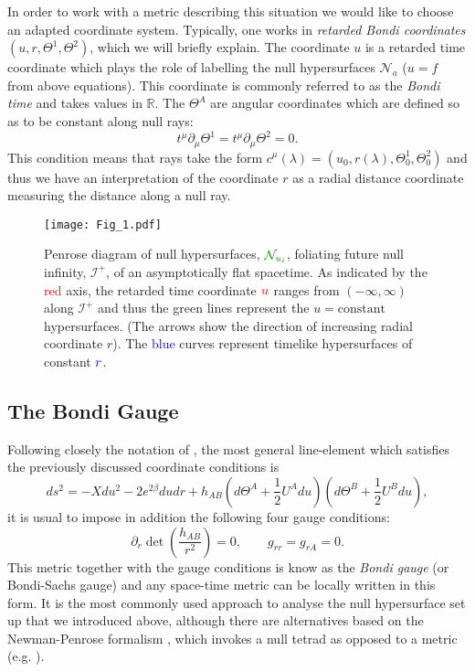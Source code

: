 \documentclass[a4paper,11pt]{article}
\numberwithin{equation}{section}
\begin{document}
In order to work with a metric describing this situation we would like to choose an adapted coordinate system. Typically, one works in \textit{retarded Bondi coordinates} $(u,r,\Theta^1,\Theta^2)$, which we will briefly explain. The coordinate $u$ is a retarded time coordinate which plays the role of labelling the null hypersurfaces $\mathcal{N}_a$ ($u=f$ from above equations). This coordinate is commonly referred to as the \textit{Bondi time} and takes values in $\mathbb{R}$. The $\Theta^A$ are angular coordinates which are defined so as to be constant along null rays:
\begin{equation}
t^{\mu} \partial_{\mu} \Theta^1=t^{\mu} \partial_{\mu} \Theta^2 = 0.
\end{equation}
This condition means that rays take the form $c^{\mu}(\lambda)=(u_0, r(\lambda),\Theta^1_0, \Theta^2_0)$ and thus we have an interpretation of the coordinate $r$ as a radial distance coordinate measuring the distance along a null ray.

\begin{figure}[H]
\begin{center}
	\texttt{[image: Fig\_1.pdf]}
	\caption{Penrose diagram of null hypersurfaces, $\color{islamicgreen}{\mathcal{N}_{u_i}}$, 	foliating future null infinity, $\mathscr{I^+}$, of an asymptotically flat spacetime. As indicated 	by the \textcolor{red}{red} axis, the retarded time coordinate $\color{red}{u}$ ranges from $(-	\infty, \infty)$ along $\mathscr{I^+}$ and thus the \textcolor{islamicgreen}{green} lines 		represent the $u=\text{constant}$ hypersurfaces. (The arrows show the direction of increasing 	radial coordinate $r$). The \textcolor{blue}{blue} curves represent timelike hypersurfaces of 	constant $\textcolor{blue}{r}$. }
\end{center}	
\end{figure}


\subsection{The Bondi Gauge}
Following closely the notation of \cite{Strominger:2017zoo}, the most general line-element which satisfies the previously discussed coordinate conditions is
\begin{equation}
ds^2=-X du^2 -2e^{2\beta}dudr+ h_{AB}\left(d\Theta^A+\frac{1}{2}U^{A}du\right)\left(d\Theta^B+\frac{1}{2}U^{B}du\right),
\end{equation} 
it is usual to impose in addition the following four gauge conditions:
\begin{equation}
\partial_r \det\left(\frac{h_{AB}}{r^2}\right)=0, \qquad g_{rr}=g_{rA}=0.
\end{equation}
This metric together with the gauge conditions is know as the \textit{Bondi gauge} (or Bondi-Sachs gauge) and any space-time metric can be locally written in this form. It is the most commonly used approach to analyse the null hypersurface set up that we introduced above, although there are alternatives based on the Newman-Penrose formalism \cite{Newman:1961qr}, which invokes a null tetrad as opposed to a metric (e.g. \cite{Barnich:2016lyg}).
\end{document}
